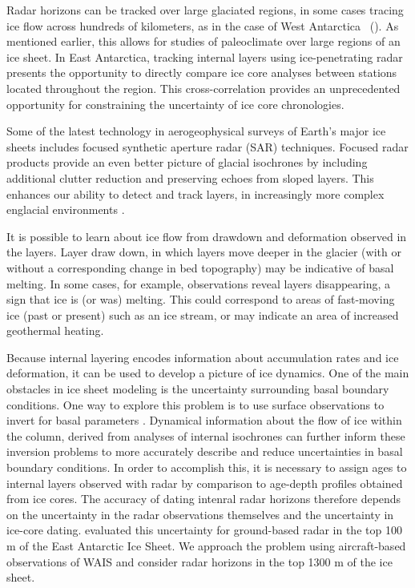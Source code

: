 \documentclass[draft,jgrga]{agutex}
\begin{document}
\begin{article}
Radar horizons can be tracked over large glaciated regions, in some cases tracing ice flow across hundreds of kilometers, as in the case of West Antarctica ~(\citet{holt2006}). As mentioned earlier, this allows for studies of paleoclimate over large regions of an ice sheet. In East Antarctica, tracking internal layers using ice-penetrating radar presents the opportunity to directly compare ice core analyses between stations located throughout the region. This cross-correlation provides an unprecedented opportunity for constraining the uncertainty of ice core chronologies. 

Some of the latest technology in aerogeophysical surveys of Earth’s major ice sheets includes focused synthetic aperture radar (SAR) techniques. Focused radar products provide an even better picture of glacial isochrones by including additional clutter reduction and preserving echoes from sloped layers. This enhances our ability to detect and track layers, in increasingly more complex englacial environments \citep{peters2005}.

It is possible to learn about ice flow from drawdown and deformation observed in the layers. Layer draw down, in which layers move deeper in the glacier (with or without a corresponding change in bed topography) may be indicative of basal melting. In some cases, for example, observations reveal layers disappearing, a sign that ice is (or was) melting. This could correspond to areas of fast-moving ice (past or present) such as an ice stream, or may indicate an area of increased geothermal heating. 

Because internal layering encodes information about accumulation rates and ice deformation, it can be used to develop a picture of ice dynamics. One of the main obstacles in ice sheet modeling is the uncertainty surrounding basal boundary conditions. One way to explore this problem is to use surface observations to invert for basal parameters \citep{thorsteinsson2003}. Dynamical information about the flow of ice within the column, derived from analyses of internal isochrones can further inform these inversion problems to more accurately describe and reduce uncertainties in basal boundary conditions. In order to accomplish this, it is necessary to assign ages to internal layers observed with radar by comparison to age-depth profiles obtained from ice cores. The accuracy of dating intenral radar horizons therefore depends on the uncertainty in the radar observations themselves and the uncertainty in ice-core dating. \cite{eisen2004} evaluated this uncertainty for ground-based radar in the top 100 m of the East Antarctic Ice Sheet. We approach the problem using aircraft-based observations of WAIS and consider radar horizons in the top 1300 m of the ice sheet.   



\end{article}
\end{document}
